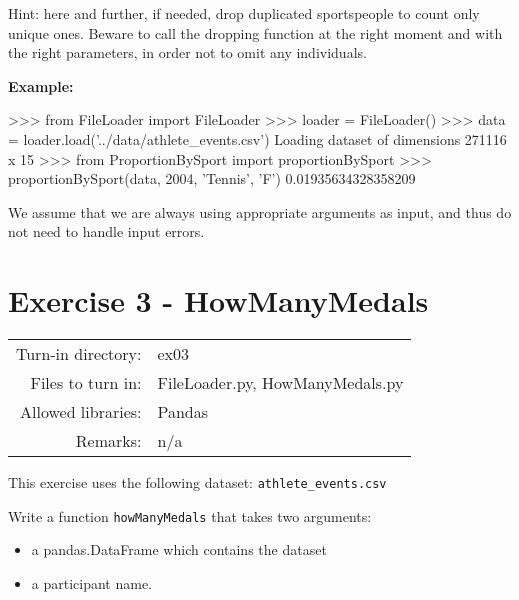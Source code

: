 \documentclass[]{article}
\newenvironment{Shaded}{\begin{snugshade}}{\end{snugshade}}
\newcommand{\DecValTok}[1]{\textcolor[rgb]{0.96,0.45,0.00}{#1}}
\newcommand{\FloatTok}[1]{\textcolor[rgb]{0.96,0.45,0.00}{#1}}
\newcommand{\ImportTok}[1]{\textcolor[rgb]{0.15,0.68,0.38}{#1}}
\newcommand{\NormalTok}[1]{\textcolor[rgb]{0.81,0.81,0.76}{#1}}
\newcommand{\OperatorTok}[1]{\textcolor[rgb]{0.81,0.81,0.76}{#1}}
\newcommand{\StringTok}[1]{\textcolor[rgb]{0.96,0.31,0.31}{#1}}
\begin{document}
Hint: here and further, if needed, drop duplicated sportspeople to count
only unique ones. Beware to call the dropping function at the right
moment and with the right parameters, in order not to omit any
individuals.

\textbf{Example:}

\begin{Shaded}
\begin{Highlighting}[]
\OperatorTok{>>>} \ImportTok{from}\NormalTok{ FileLoader }\ImportTok{import}\NormalTok{ FileLoader}
\OperatorTok{>>>}\NormalTok{ loader }\OperatorTok{=}\NormalTok{ FileLoader()}
\OperatorTok{>>>}\NormalTok{ data }\OperatorTok{=}\NormalTok{ loader.load(}\StringTok{'../data/athlete_events.csv'}\NormalTok{)}
\NormalTok{Loading dataset of dimensions }\DecValTok{271116}\NormalTok{ x }\DecValTok{15}
\OperatorTok{>>>} \ImportTok{from}\NormalTok{ ProportionBySport }\ImportTok{import}\NormalTok{ proportionBySport}
\OperatorTok{>>>}\NormalTok{ proportionBySport(data, }\DecValTok{2004}\NormalTok{, }\StringTok{'Tennis'}\NormalTok{, }\StringTok{'F'}\NormalTok{)}
\FloatTok{0.01935634328358209}
\end{Highlighting}
\end{Shaded}

We assume that we are always using appropriate arguments as input, and
thus do not need to handle input errors.

\clearpage

\hypertarget{exercise-3---howmanymedals}{%
\section{Exercise 3 - HowManyMedals}\label{exercise-3---howmanymedals}}

\begin{longtable}[]{@{}rl@{}}
\toprule
\endhead
Turn-in directory: & ex03\tabularnewline
Files to turn in: & FileLoader.py, HowManyMedals.py\tabularnewline
Allowed libraries: & Pandas\tabularnewline
Remarks: & n/a\tabularnewline
\bottomrule
\end{longtable}

This exercise uses the following dataset: \texttt{athlete\_events.csv}

Write a function \texttt{howManyMedals} that takes two arguments:

\begin{itemize}
\item
  a pandas.DataFrame which contains the dataset
\item
  a participant name.
\end{itemize}
\end{document}
